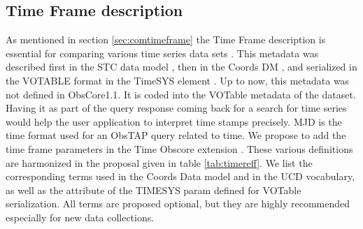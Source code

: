\documentclass[11pt,a4paper]{ivoa}
\begin{document}
  \subsection{Time Frame description}
  As mentioned in section \ref{sec:comtimeframe} the Time Frame description is essential for comparing various time series data sets .
This metadata was described first in the STC data model  \citep{2007ivoa.spec.1030R}, then  in the Coords DM \citep{2022ivoa.specQ1004R}, and serialized in the  VOTABLE format in the TimeSYS element .
Up to now, this metadata  was not defined in ObsCore1.1. It is coded into the VOTable  metadata of the dataset. 
Having  it as  part of the query response coming back for a search for time series would help the user application to interpret time stamps precisely.
MJD is the time format used for an ObsTAP query related to time. 
We propose to add the time frame parameters in the Time Obscore extension .
These various definitions are harmonized in the proposal given in  table \ref{tab:timereff}. We list the corresponding terms used in the Coords Data model and in the UCD vocabulary, as well as the attribute of the TIMESYS param defined for VOTable serialization. 
All terms are proposed optional, but they are highly recommended especially for new data collections. 
\end{document}
